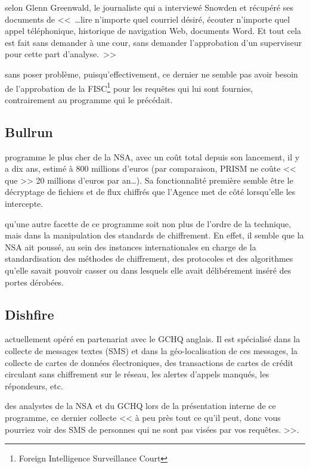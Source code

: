  selon Glenn Greenwald, le journaliste qui a
interviewé Snowden et récupéré ses documents de <<~\ldots lire n'importe quel
courriel désiré, écouter n'importe quel appel téléphonique, historique de
navigation Web, documents Word. Et tout cela est fait sans demander à une cour,
sans demander l'approbation d'un superviseur pour cette part
d'analyse.~>>\autocite{GGW}

 sans poser problème, puisqu'effectivement, ce dernier
ne semble pas avoir besoin de l'approbation de la FISC\footnote{Foreign
Intelligence Surveillance Court} pour les requêtes qui lui sont
fournies\autocite{Kimery}, contrairement au programme qui le précédait.

\subsection{Bullrun}

 programme le plus cher de la NSA, avec un
coût total depuis son lancement, il y a dix ans, estimé à 800 millions
d'euros\autocite{bullrun} (par comparaison, PRISM ne coûte << que >> 20 millions
d'euros par an\ldots).
Sa fonctionnalité première semble être le décryptage de fichiers et de flux
chiffrés que l'Agence met de côté lorsqu'elle les intercepte. 

 qu'une autre facette de ce programme soit non
plus de l'ordre de la technique, mais dans la manipulation des standards de
chiffrement. En effet, il semble que la NSA ait poussé, au sein des instances
internationales en charge de la standardisation des méthodes de chiffrement, des
protocoles et des algorithmes qu'elle savait pouvoir casser\autocite{NYTenc} ou dans
lesquels elle avait délibérement inséré des portes dérobées.

\subsection{Dishfire}

 actuellement opéré en partenariat avec le GCHQ
anglais. Il est spécialisé dans la collecte de messages textes (SMS) et dans la
géo-localisation de ces messages, la collecte de cartes de données
électroniques, des transactions de cartes de crédit circulant sans chiffrement sur le réseau,
les alertes d'appels manqués, les répondeurs, etc.

 des analystes de la NSA et du GCHQ lors de la
présentation interne de ce programme, ce dernier collecte << à peu près tout ce
qu'il peut, donc vous pourriez voir des SMS de personnes qui ne sont pas visées
par vos requêtes. >>\autocite{Guardian}.

